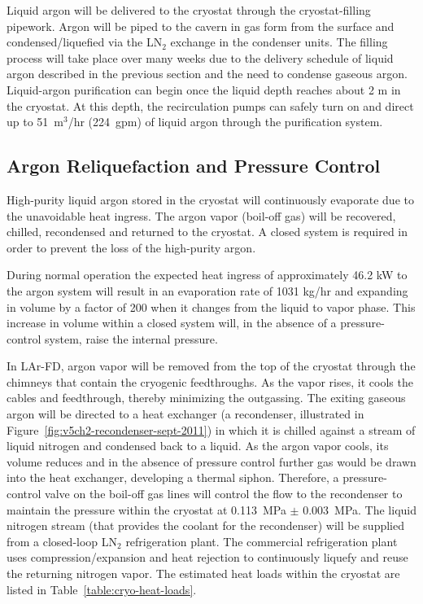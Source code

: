 Liquid argon will be delivered to the cryostat through the cryostat-filling pipework. Argon will
be piped to the cavern in gas form from the surface
and condensed/liquefied via the LN$_{2}$ exchange in the condenser units.
The filling process will take place over many weeks due to the delivery schedule of liquid
argon described in the previous section and the need to condense gaseous argon.
Liquid-argon purification can begin once the liquid
depth reaches about 2 m in the cryostat. At this depth, the recirculation pumps can safely
turn on and direct up to 51~m$^{3}$/hr (224~gpm) of liquid argon through the purification system.

\subsection{Argon Reliquefaction and Pressure Control}
\label{subsec:reliquef}

High-purity liquid argon stored in the cryostat will continuously evaporate due to the unavoidable heat ingress.  The argon vapor (boil-off gas) will be recovered, chilled, recondensed and returned to the 
cryostat. A closed system is required in order to prevent the loss of the high-purity argon.

During normal operation the expected heat ingress of approximately 46.2 kW to the argon
system will result in an evaporation rate of
1031 kg/hr and expanding in
volume by a factor of 200 when it changes from the liquid to vapor phase. This increase in
volume within a closed system will, in the absence of a pressure-control system, raise the
internal pressure.

In LAr-FD, argon vapor will be removed from the top of the cryostat through the chimneys that contain the cryogenic feedthroughs. As the vapor rises, it cools the cables and feedthrough, thereby minimizing the outgassing. 
The exiting gaseous argon will be directed to a heat exchanger (a recondenser, illustrated in Figure~\ref{fig:v5ch2-recondenser-sept-2011}) in which it is chilled against a stream of liquid nitrogen and condensed back to a liquid. 
As the argon vapor cools, its volume reduces and in the absence of pressure control
further gas would be drawn into the heat exchanger, developing a thermal siphon.  Therefore, a pressure-control valve on 
the boil-off gas lines will control the flow to the recondenser to maintain the pressure within the cryostat  at 0.113~MPa $\pm$ 0.003~MPa.  
The liquid nitrogen stream (that provides the coolant for the recondenser) 
 will be supplied from a closed-loop LN$_{2}$ refrigeration plant.  The commercial refrigeration plant uses compression/expansion and heat rejection to continuously liquefy and reuse the returning nitrogen vapor. The estimated heat loads within the cryostat are listed in Table~\ref{table:cryo-heat-loads}.
 
